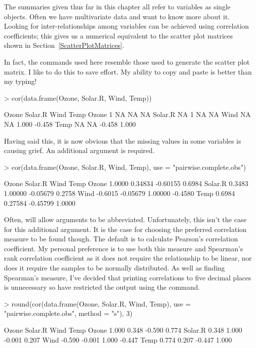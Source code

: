 The summaries given thus far in this chapter all refer to variables as single objects. Often we have multivariate data and want to know more about it. Looking for inter-relationships among variables can be achieved using correlation coefficients; this gives us a numerical equivalent to the scatter plot matrices shown in Section~\ref{ScatterPlotMatrices}. 
 
In fact, the commands used here resemble those used to generate the scatter plot matrix. I like to do this to save effort. My ability to copy and paste is better than my typing! 
\begin{Schunk}
\begin{Sinput}
> cor(data.frame(Ozone, Solar.R, Wind, Temp)) 
\end{Sinput}
\begin{Soutput}
        Ozone Solar.R   Wind   Temp
Ozone       1      NA     NA     NA
Solar.R    NA       1     NA     NA
Wind       NA      NA  1.000 -0.458
Temp       NA      NA -0.458  1.000
\end{Soutput}
\end{Schunk}
Having said this, it is now obvious that the missing values in some variables is causing grief. An additional argument is required. 
\begin{Schunk}
\begin{Sinput}
> cor(data.frame(Ozone, Solar.R, Wind, Temp),  
   use = "pairwise.complete.obs") 
\end{Sinput}
\begin{Soutput}
          Ozone  Solar.R     Wind    Temp
Ozone    1.0000  0.34834 -0.60155  0.6984
Solar.R  0.3483  1.00000 -0.05679  0.2758
Wind    -0.6015 -0.05679  1.00000 -0.4580
Temp     0.6984  0.27584 -0.45799  1.0000
\end{Soutput}
\end{Schunk}
Often, \R{} will allow arguments to be abbreviated. Unfortunately, this isn't the case for this additional argument. It is the case for choosing the preferred correlation measure to be found though. The default is to calculate Pearson's correlation coefficient. My personal preference is to use both this measure and Spearman's rank correlation coefficient as it does not require the relationship to be linear, nor does it require the samples to be normally distributed. As well as finding Spearman's measure, I've decided that printing correlations to five decimal places is unnecessary so have restricted the output using the  command. 
\begin{Schunk}
\begin{Sinput}
> round(cor(data.frame(Ozone, Solar.R, Wind, Temp),  
   use = "pairwise.complete.obs", method = "s"), 3) 
\end{Sinput}
\begin{Soutput}
         Ozone Solar.R   Wind   Temp
Ozone    1.000   0.348 -0.590  0.774
Solar.R  0.348   1.000 -0.001  0.207
Wind    -0.590  -0.001  1.000 -0.447
Temp     0.774   0.207 -0.447  1.000
\end{Soutput}
\end{Schunk}
 
